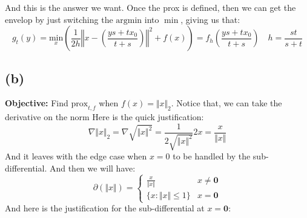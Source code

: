 \documentclass[]{article}
\begin{document}
        And this is the answer we want. Once the prox is defined, then we can get the envelop by just switching  the $\text{argmin}$ into $\min$, giving us that: 
        \begin{equation*}\tag{2a5}\label{eqn:2a5}
            g_t(y) = 
            \underset{x}{\text{min}}
            \left(
                \frac{1}{2h}
                \left\Vert x - \left(
                    \frac{ys + tx_0}{t + s}
                \right)\right\Vert^2
                + f(x)
            \right)
            =
            f_h \left(
                    \frac{ys + tx_0}{t + s}
            \right)
            \quad
            h =
            \frac{st}{s + t}
        \end{equation*}

    \subsection*{(b)}
        \textbf{Objective: } Find $\text{prox}_{t,f}$ when $f(x) = \Vert x\Vert_2$. 
        Notice that, we can take the derivative on the norm
        Here is the quick justification: 
        \begin{equation*}\tag{2b1}\label{eqn:2b1}
            \nabla \Vert x\Vert_2 = \nabla \sqrt{\Vert x \Vert^2}
            = \frac{1}{2 \sqrt{\Vert x\Vert^2}} 2x = \frac{x}{\Vert x\Vert}
        \end{equation*}
        And it leaves with the edge case when $x = 0$ to be handled by the sub-differential. 
        And then we will have: 
        \begin{equation*}\tag{2b1.1}\label{eqn:2b1.1}
            \partial(\Vert x\Vert) = 
            \begin{cases}
                \frac{x}{\Vert x\Vert} & x \neq \mathbf{0}
                \\
                \lbrace x: \Vert x\Vert \le 1\rbrace & x = \mathbf{0}
            \end{cases}
        \end{equation*}
        And here is the justification for the sub-differential at $x = \mathbf{0}$: 
\end{document}
